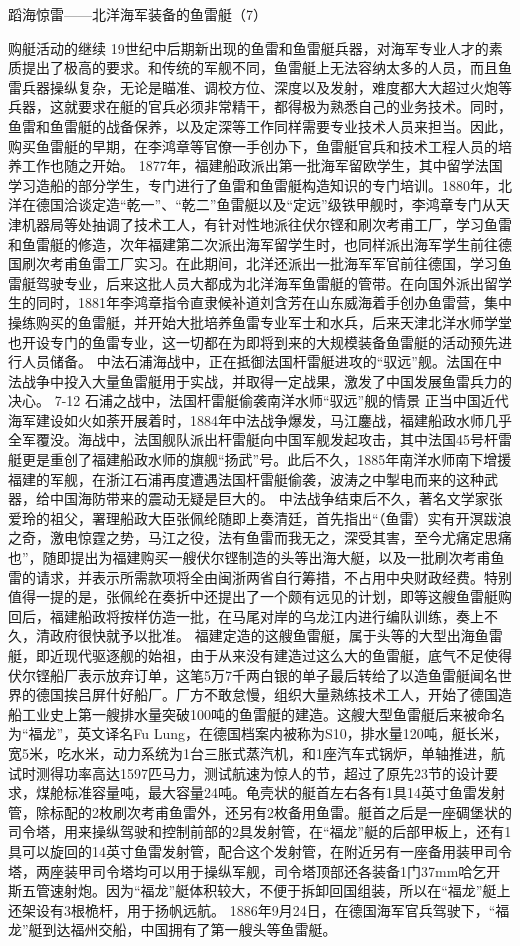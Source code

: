 \documentclass[12pt,UTF8]{ctexbook}
\begin{document}
蹈海惊雷——北洋海军装备的鱼雷艇（7）

购艇活动的继续
19世纪中后期新出现的鱼雷和鱼雷艇兵器，对海军专业人才的素质提出了极高的要求。和传统的军舰不同，鱼雷艇上无法容纳太多的人员，而且鱼雷兵器操纵复杂，无论是瞄准、调校方位、深度以及发射，难度都大大超过火炮等兵器，这就要求在艇的官兵必须非常精干，都得极为熟悉自己的业务技术。同时，鱼雷和鱼雷艇的战备保养，以及定深等工作同样需要专业技术人员来担当。因此，购买鱼雷艇的早期，在李鸿章等官僚一手创办下，鱼雷艇官兵和技术工程人员的培养工作也随之开始。
1877年，福建船政派出第一批海军留欧学生，其中留学法国学习造船的部分学生，专门进行了鱼雷和鱼雷艇构造知识的专门培训。1880年，北洋在德国洽谈定造“乾一”、“乾二”鱼雷艇以及“定远”级铁甲舰时，李鸿章专门从天津机器局等处抽调了技术工人，有针对性地派往伏尔铿和刷次考甫工厂，学习鱼雷和鱼雷艇的修造，次年福建第二次派出海军留学生时，也同样派出海军学生前往德国刷次考甫鱼雷工厂实习。在此期间，北洋还派出一批海军军官前往德国，学习鱼雷艇驾驶专业，后来这批人员大都成为北洋海军鱼雷艇的管带。在向国外派出留学生的同时，1881年李鸿章指令直隶候补道刘含芳在山东威海着手创办鱼雷营，集中操练购买的鱼雷艇，并开始大批培养鱼雷专业军士和水兵，后来天津北洋水师学堂也开设专门的鱼雷专业，这一切都在为即将到来的大规模装备鱼雷艇的活动预先进行人员储备。
中法石浦海战中，正在抵御法国杆雷艇进攻的“驭远”舰。法国在中法战争中投入大量鱼雷艇用于实战，并取得一定战果，激发了中国发展鱼雷兵力的决心。
7-12 石浦之战中，法国杆雷艇偷袭南洋水师“驭远”舰的情景
正当中国近代海军建设如火如荼开展着时，1884年中法战争爆发，马江鏖战，福建船政水师几乎全军覆没。海战中，法国舰队派出杆雷艇向中国军舰发起攻击，其中法国45号杆雷艇更是重创了福建船政水师的旗舰“扬武”号。此后不久，1885年南洋水师南下增援福建的军舰，在浙江石浦再度遭遇法国杆雷艇偷袭，波涛之中掣电而来的这种武器，给中国海防带来的震动无疑是巨大的。
中法战争结束后不久，著名文学家张爱玲的祖父，署理船政大臣张佩纶随即上奏清廷，首先指出“（鱼雷）实有开溟跋浪之奇，激电惊霆之势，马江之役，法有鱼雷而我无之，深受其害，至今尤痛定思痛也”，随即提出为福建购买一艘伏尔铿制造的头等出海大艇，以及一批刷次考甫鱼雷的请求，并表示所需款项将全由闽浙两省自行筹措，不占用中央财政经费。特别值得一提的是，张佩纶在奏折中还提出了一个颇有远见的计划，即等这艘鱼雷艇购回后，福建船政将按样仿造一批，在马尾对岸的乌龙江内进行编队训练，奏上不久，清政府很快就予以批准。
福建定造的这艘鱼雷艇，属于头等的大型出海鱼雷艇，即近现代驱逐舰的始祖，由于从来没有建造过这么大的鱼雷艇，底气不足使得伏尔铿船厂表示放弃订单，这笔5万7千两白银的单子最后转给了以造鱼雷艇闻名世界的德国挨吕屏什好船厂。厂方不敢怠慢，组织大量熟练技术工人，开始了德国造船工业史上第一艘排水量突破100吨的鱼雷艇的建造。这艘大型鱼雷艇后来被命名为“福龙”，英文译名Fu Lung，在德国档案内被称为S10，排水量120吨，艇长米，宽5米，吃水米，动力系统为1台三胀式蒸汽机，和1座汽车式锅炉，单轴推进，航试时测得功率高达1597匹马力，测试航速为惊人的节，超过了原先23节的设计要求，煤舱标准容量吨，最大容量24吨。龟壳状的艇首左右各有1具14英寸鱼雷发射管，除标配的2枚刷次考甫鱼雷外，还另有2枚备用鱼雷。艇首之后是一座碉堡状的司令塔，用来操纵驾驶和控制前部的2具发射管，在“福龙”艇的后部甲板上，还有1具可以旋回的14英寸鱼雷发射管，配合这个发射管，在附近另有一座备用装甲司令塔，两座装甲司令塔均可以用于操纵军舰，司令塔顶部还各装备1门37mm哈乞开斯五管速射炮。因为“福龙”艇体积较大，不便于拆卸回国组装，所以在“福龙”艇上还架设有3根桅杆，用于扬帆远航。 1886年9月24日，在德国海军官兵驾驶下，“福龙”艇到达福州交船，中国拥有了第一艘头等鱼雷艇。
\end{document}
